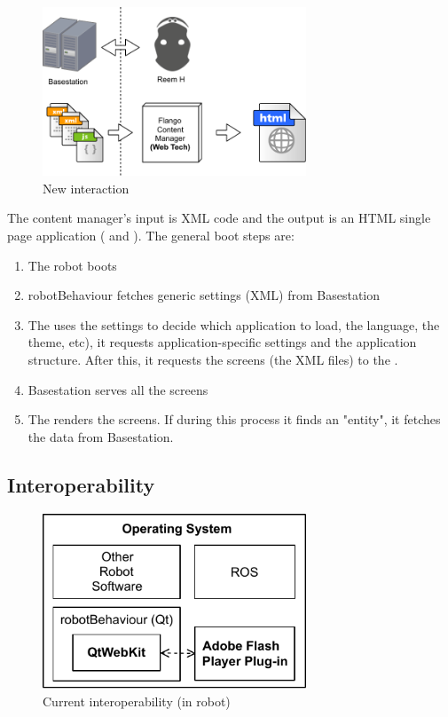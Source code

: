 \begin{figure}[htb]
    \centering
    \includegraphics[width=0.7\textwidth]{figures/interaction-new}
    \caption{New interaction}
    \label{fig:interaction-new}
\end{figure}

The content manager's input is \ac{XML} code and the output is an \ac{HTML} single page application ( and ).
The general boot steps are:

\begin{enumerate}
    \item The robot boots
    \item robotBehaviour fetches generic settings (\ac{XML}) from Basestation
    \item The \cm uses the settings to decide which application to load, the language, the theme, etc), it requests application-specific settings and the application structure. After this, it requests the screens (the \ac{XML} files) to the \flangobe .
    \item Basestation serves all the screens
    \item The \cm renders the screens. If during this process it finds an "entity", it fetches the data from Basestation.
\end{enumerate}

\FloatBarrier

\subsection{Interoperability}
\begin{figure}[htb]
    \centering
    \includegraphics[width=0.7\textwidth]{figures/interoperability-original}
    \caption{Current interoperability (in robot)}
    \label{fig:interoperability-original}
\end{figure}

